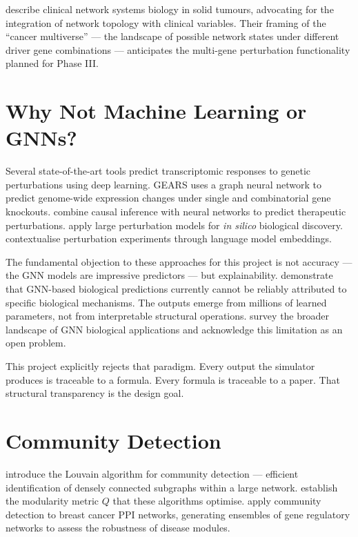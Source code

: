 \documentclass[12pt,a4paper]{report}
\begin{document}
\citet{mambetsariev2023clinical} describe clinical network systems biology in solid tumours, advocating for the integration of network topology with clinical variables. Their framing of the ``cancer multiverse'' — the landscape of possible network states under different driver gene combinations — anticipates the multi-gene perturbation functionality planned for Phase III.

\section{Why Not Machine Learning or GNNs?}

Several state-of-the-art tools predict transcriptomic responses to genetic perturbations using deep learning. GEARS \citep{roohani2023gears} uses a graph neural network to predict genome-wide expression changes under single and combinatorial gene knockouts. \citet{gonzalez2024combinatorial} combine causal inference with neural networks to predict therapeutic perturbations. \citet{miladinovic2025silico} apply large perturbation models for \textit{in silico} biological discovery. \citet{wu2025contextualizing} contextualise perturbation experiments through language model embeddings.

The fundamental objection to these approaches for this project is not accuracy — the GNN models are impressive predictors — but explainability. \citet{petre2022explainability} demonstrate that GNN-based biological predictions currently cannot be reliably attributed to specific biological mechanisms. The outputs emerge from millions of learned parameters, not from interpretable structural operations. \citet{zheng2023survey} survey the broader landscape of GNN biological applications and acknowledge this limitation as an open problem.

This project explicitly rejects that paradigm. Every output the simulator produces is traceable to a formula. Every formula is traceable to a paper. That structural transparency is the design goal.

\section{Community Detection}

\citet{blondel2008fast} introduce the Louvain algorithm for community detection — efficient identification of densely connected subgraphs within a large network. \citet{newman2006modularity} establish the modularity metric $Q$ that these algorithms optimise. \citet{lim2021generating} apply community detection to breast cancer PPI networks, generating ensembles of gene regulatory networks to assess the robustness of disease modules.
\end{document}
